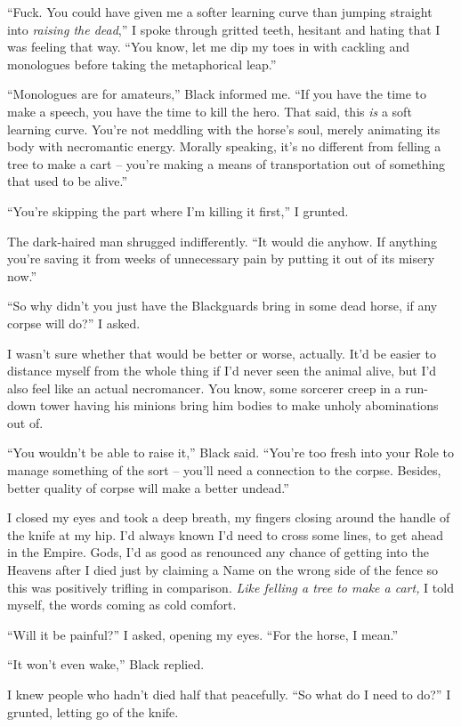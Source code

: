 \documentclass[12pt, openany]{book}
\begin{document}
“Fuck. You could have given me a softer learning curve than jumping straight into \textit{raising the dead},” I spoke through gritted teeth, hesitant and hating that I was feeling that way. “You know, let me dip my toes in with cackling and monologues before taking the metaphorical leap.”

“Monologues are for amateurs,” Black informed me. “If you have the time to make a speech, you have the time to kill the hero. That said, this \textit{is }a soft learning curve. You’re not meddling with the horse’s soul, merely animating its body with necromantic energy. Morally speaking, it’s no different from felling a tree to make a cart – you’re making a means of transportation out of something that used to be alive.”

“You’re skipping the part where I’m killing it first,” I grunted.

The dark-haired man shrugged indifferently. “It would die anyhow. If anything you’re saving it from weeks of unnecessary pain by putting it out of its misery now.”

“So why didn’t you just have the Blackguards bring in some dead horse, if any corpse will do?” I asked.

I wasn’t sure whether that would be better or worse, actually. It’d be easier to distance myself from the whole thing if I’d never seen the animal alive, but I’d also feel like an actual necromancer. You know, some sorcerer creep in a run-down tower having his minions bring him bodies to make unholy abominations out of.

“You wouldn’t be able to raise it,” Black said. “You’re too fresh into your Role to manage something of the sort – you’ll need a connection to the corpse. Besides, better quality of corpse will make a better undead.”

I closed my eyes and took a deep breath, my fingers closing around the handle of the knife at my hip. I’d always known I’d need to cross some lines, to get ahead in the Empire. Gods, I’d as good as renounced any chance of getting into the Heavens after I died just by claiming a Name on the wrong side of the fence so this was positively trifling in comparison. \textit{Like felling a tree to make a cart,} I told myself, the words coming as cold comfort.

“Will it be painful?” I asked, opening my eyes. “For the horse, I mean.”

“It won’t even wake,” Black replied.

I knew people who hadn’t died half that peacefully. “So what do I need to do?” I grunted, letting go of the knife.
\end{document}
